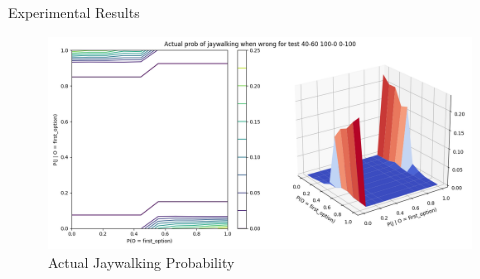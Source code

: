 \documentclass{beamer}
\begin{document}
\begin{frame}{Experimental Results}
    \begin{figure}
        \includegraphics[scale=0.25]{test_40-60_100-0_0-100_jay_prob.png}
        \caption{Actual Jaywalking Probability}
    \end{figure}
\end{frame}
\end{document}
